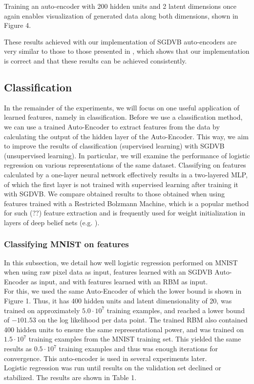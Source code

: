 \documentclass{article}
\begin{document}
Training an auto-encoder with 200 hidden units and 2 latent dimensions once again enables visualization of generated data along both dimensions, shown in Figure 4.

These results achieved with our implementation of SGDVB auto-encoders are very similar to those to those presented in \cite{kingma2013auto}, which shows that our implementation is correct and that these results can be achieved consistently. 

\subsection{Classification}

In the remainder of the experiments, we will focus on one useful application of learned features, namely in classification. Before we use a classification method, we can use a trained Auto-Encoder to extract features from the data by calculating the output of the hidden layer of the Auto-Encoder. This way, we aim to improve the results of classification (supervised learning) with SGDVB (unsupervised learning). In particular, we will examine the performance of logistic regression on various representations of the same dataset. Classifying on features calculated by a one-layer neural network effectively results in a two-layered MLP, of which the first layer is not trained with supervised learning after training it with SGDVB. We compare obtained results to those obtained when using features trained with a Restricted Bolzmann Machine, which is a popular method for such (??) feature extraction and is frequently used for weight initialization in layers of deep belief nets (e.g. \cite{bengio2007greedy} ).

\subsubsection{Classifying MNIST on features}

In this subsection, we detail how well logistic regression performed on MNIST when using raw pixel data as input, features learned with an SGDVB Auto-Encoder as input, and with features learned with an RBM as input. \\ For this, we used the same Auto-Encoder of which the lower bound is shown in Figure 1. Thus, it has 400 hidden units and latent dimensionality of 20, was trained on approximately $5.0\cdot 10^7$ training examples, and reached a lower bound of $-101.53$ on the log likelihood per data point. The trained RBM also contained 400 hidden units to ensure the same representational power, and was trained on $1.5\cdot 10^7$ training examples from the MNIST training set. This yielded the same results as $0.5\cdot 10^7$ training examples and thus was enough iterations for convergence. This auto-encoder is used in several experiments later. \\
Logistic regression was run until results on the validation set declined or stabilized. The results are shown in Table 1.
\end{document}

